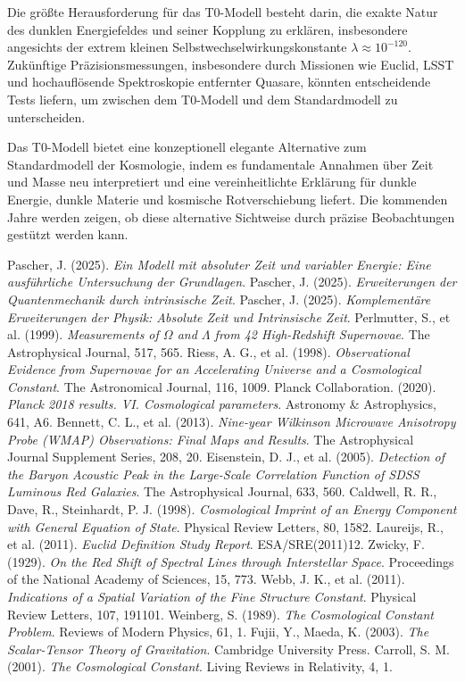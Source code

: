 \documentclass[a4paper,12pt]{article}
\theoremstyle{definition}
\theoremstyle{remark}
\begin{document}
	Die größte Herausforderung für das T0-Modell besteht darin, die exakte Natur des dunklen Energiefeldes und seiner Kopplung zu erklären, insbesondere angesichts der extrem kleinen Selbstwechselwirkungskonstante $\lambda \approx 10^{-120}$. Zukünftige Präzisionsmessungen, insbesondere durch Missionen wie Euclid, LSST und hochauflösende Spektroskopie entfernter Quasare, könnten entscheidende Tests liefern, um zwischen dem T0-Modell und dem Standardmodell zu unterscheiden.
	
	Das T0-Modell bietet eine konzeptionell elegante Alternative zum Standardmodell der Kosmologie, indem es fundamentale Annahmen über Zeit und Masse neu interpretiert und eine vereinheitlichte Erklärung für dunkle Energie, dunkle Materie und kosmische Rotverschiebung liefert. Die kommenden Jahre werden zeigen, ob diese alternative Sichtweise durch präzise Beobachtungen gestützt werden kann.
	
	\begin{thebibliography}{99}
		 Pascher, J. (2025). \textit{Ein Modell mit absoluter Zeit und variabler Energie: Eine ausführliche Untersuchung der Grundlagen}.
		 Pascher, J. (2025). \textit{Erweiterungen der Quantenmechanik durch intrinsische Zeit}.
		 Pascher, J. (2025). \textit{Komplementäre Erweiterungen der Physik: Absolute Zeit und Intrinsische Zeit}.
		 Perlmutter, S., et al. (1999). \textit{Measurements of $\Omega$ and $\Lambda$ from 42 High-Redshift Supernovae}. The Astrophysical Journal, 517, 565.
		 Riess, A. G., et al. (1998). \textit{Observational Evidence from Supernovae for an Accelerating Universe and a Cosmological Constant}. The Astronomical Journal, 116, 1009.
		 Planck Collaboration. (2020). \textit{Planck 2018 results. VI. Cosmological parameters}. Astronomy \& Astrophysics, 641, A6.
		 Bennett, C. L., et al. (2013). \textit{Nine-year Wilkinson Microwave Anisotropy Probe (WMAP) Observations: Final Maps and Results}. The Astrophysical Journal Supplement Series, 208, 20.
		 Eisenstein, D. J., et al. (2005). \textit{Detection of the Baryon Acoustic Peak in the Large-Scale Correlation Function of SDSS Luminous Red Galaxies}. The Astrophysical Journal, 633, 560.
		 Caldwell, R. R., Dave, R., Steinhardt, P. J. (1998). \textit{Cosmological Imprint of an Energy Component with General Equation of State}. Physical Review Letters, 80, 1582.
		 Laureijs, R., et al. (2011). \textit{Euclid Definition Study Report}. ESA/SRE(2011)12.
		 Zwicky, F. (1929). \textit{On the Red Shift of Spectral Lines through Interstellar Space}. Proceedings of the National Academy of Sciences, 15, 773.
		 Webb, J. K., et al. (2011). \textit{Indications of a Spatial Variation of the Fine Structure Constant}. Physical Review Letters, 107, 191101.
		 Weinberg, S. (1989). \textit{The Cosmological Constant Problem}. Reviews of Modern Physics, 61, 1.
		 Fujii, Y., Maeda, K. (2003). \textit{The Scalar-Tensor Theory of Gravitation}. Cambridge University Press.
		 Carroll, S. M. (2001). \textit{The Cosmological Constant}. Living Reviews in Relativity, 4, 1.
	\end{thebibliography}
	
\end{document}

